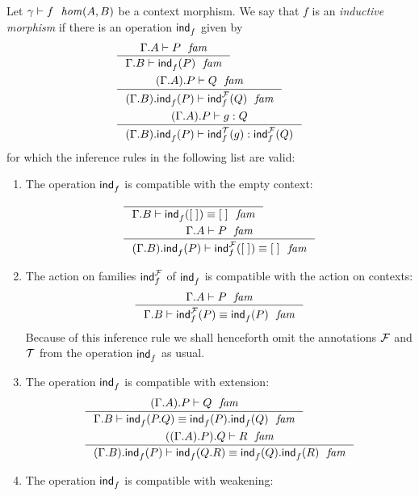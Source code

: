 \begin{defn}
Let $\jhom{\gamma}{A}{B}{f}$ be a context morphism. We say that $f$ is an
\emph{inductive morphism} if there is an operation $\tfindf{f}$ given by
\begin{align*}
& \inference
  { \jfam{{\Gamma}{A}}{P}
    }
  { \jfam{{\Gamma}{B}}{\tfind{f}{P}}
    }
  \\
& \inference
  { \jfam{{{\Gamma}{A}}{P}}{Q}
    }
  { \jfam{{{\Gamma}{B}}{\tfind{f}{P}}}{\tfind[\famsym]{f}{Q}}
    }
  \\
& \inference
  { \jterm{{{\Gamma}{A}}{P}}{Q}{g}
    }
  { \jterm{{{\Gamma}{B}}{\tfind{f}{P}}}{\tfind[\famsym]{f}{Q}}{\tfind[\tmsym]{f}{g}}
    }
\end{align*}
for which the inference rules in the following list are valid:
\begin{enumerate}
\item The operation $\tfindf{f}$ is compatible with the empty context:
\begin{align*}
& \inference
  { 
    }
  { \jfameq{{\Gamma}{B}}{\tfind{f}{\emptyf}}{\emptyf}
    }
  \\
& \inference
  { \jfam{{\Gamma}{A}}{P}
    }
  { \jfameq{{{\Gamma}{B}}{\tfind{f}{P}}}{\tfind[\famsym]{f}{\emptyf}}{\emptyf}
    }
\end{align*}
\item The action on families $\tfindf[\famsym]{f}$ of $\tfindf{f}$ is compatible
with the action on contexts:
\begin{equation*}
\inference
  { \jfam{{\Gamma}{A}}{P}
    }
  { \jfameq{{\Gamma}{B}}{\tfind[\famsym]{f}{P}}{\tfind{f}{P}}
    }
\end{equation*}
Because of this inference rule we shall henceforth omit the annotations
$\famsym$ and $\tmsym$ from the operation $\tfindf{f}$ as usual.
\item The operation $\tfindf{f}$ is compatible with extension:
\begin{align*}
& \inference
  { \jfam{{{\Gamma}{A}}{P}}{Q}
    }
  { \jfameq
      {{\Gamma}{B}}
      {\tfind{f}{\ctxext{P}{Q}}}
      {\ctxext{\tfind{f}{P}}{\tfind{f}{Q}}}
    }
  \\
& \inference
  { \jfam{{{{\Gamma}{A}}{P}}{Q}}{R}
    }
  { \jfameq
      {{{\Gamma}{B}}{\tfind{f}{P}}}
      {\tfind{f}{\ctxext{Q}{R}}}
      {\ctxext{\tfind{f}{Q}}{\tfind{f}{R}}}
    }
\end{align*}
\item The operation $\tfindf{f}$ is compatible with weakening:
\begin{align*}

\end{align*}
\end{enumerate}
\end{defn}
